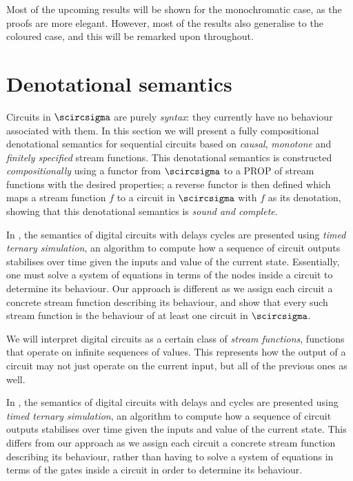 \documentclass{lmcs}
\begin{document}
Most of the upcoming results will be shown for the monochromatic case, as the
proofs are more elegant.
However, most of the results also generalise to the coloured case, and this will
be remarked upon throughout.

\section{Denotational semantics}

Circuits in \(\scircsigma\) are purely \emph{syntax}: they currently have no
behaviour associated with them.
In this section we will present a fully compositional denotational
semantics for sequential circuits based on \emph{causal}, \emph{monotone} and
\emph{finitely specified} stream functions.
This denotational semantics is constructed \emph{compositionally} using a
functor from \(\scircsigma\) to a PROP of stream functions with the desired
properties; a reverse functor is then defined which maps a stream function \(f\)
to a circuit in \(\scircsigma\) with \(f\) as its denotation, showing that this
denotational semantics is \emph{sound and complete}.

\begin{rem}
    In \cite{mendler2012constructive}, the semantics of digital circuits with
    delays cycles are presented using \emph{timed ternary simulation}, an
    algorithm to compute how a sequence of circuit outputs stabilises over time
    given the inputs and value of the current state.
    Essentially, one must solve a system of equations in terms of the nodes
    inside a circuit to determine its behaviour.
    Our approach is different as we assign each circuit a concrete stream
    function describing its behaviour, and show that every such stream function
    is the behaviour of at least one circuit in \(\scircsigma\).
\end{rem}

We will interpret digital circuits as a certain class of
\emph{stream functions}, functions that operate on infinite sequences of values.
This represents how the output of a circuit may not just operate on the current
input, but all of the previous ones as well.

\begin{rem}
    In \cite{mendler2012constructive}, the semantics of digital circuits with
    delays and cycles are presented using \emph{timed ternary simulation}, an
    algorithm to compute how a sequence of circuit outputs stabilises over time
    given the inputs and value of the current state.
    This differs from our approach as we assign each circuit a concrete stream
    function describing its behaviour, rather than having to solve a system of
    equations in terms of the gates inside a circuit in order to determine its
    behaviour.
\end{rem}
\end{document}
